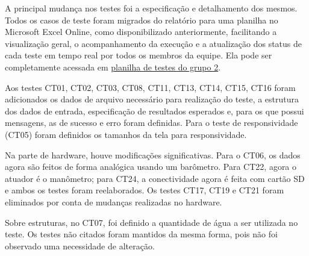 \begin{samepage}

A principal mudança nos testes foi a especificação e detalhamento dos mesmos. Todos os casos de teste foram migrados do relatório para uma planilha no Microsoft Excel Online, como disponibilizado anteriormente, facilitando a visualização geral, o acompanhamento da execução e a atualização dos status de cada teste em tempo real por todos os membros da equipe. Ela pode ser completamente acessada em
\href{https://unbbr.sharepoint.com/:x:/s/PI1-Grupo2330/EY-ZE1arh2RGgJju4ij_Er4BGhCN5S1qYQiIwdHMMRtLBg?e=fs9Vxi}{planilha de testes do grupo 2}.


Aos testes CT01, CT02, CT03, CT08, CT11, CT13, CT14, CT15, CT16 foram adicionados os dados de arquivo necessário para realização do teste, a estrutura dos dados de entrada, especificação de resultados esperados e, para os que possui mensagens, as de sucesso e erro foram definidas. Para o teste de responsividade (CT05) foram definidos os tamanhos da tela para responsividade. 

Na parte de hardware, houve modificações significativas. Para o CT06, os dados agora são feitos de forma analógica usando um barômetro.  Para CT22, agora o atuador é o manômetro; para CT24, a conectividade agora é feita com cartão SD e ambos os testes foram reelaborados. Os testes CT17, CT19 e CT21 foram eliminados por conta de mudanças realizadas no hardware. 

Sobre estruturas, no CT07, foi definido a quantidade de água a ser utilizada no teste.  Os testes não citados foram mantidos da mesma forma, pois não foi observado uma necessidade de alteração. 


\end{samepage}
% 